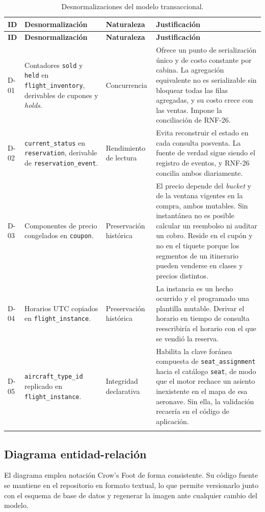 \documentclass[10pt,letterpaper]{article}
\begin{document}
\begin{longtable}{@{}L{1.2cm} L{4.8cm} L{3.0cm} L{6.8cm}@{}}
\toprule \textbf{ID} & \textbf{Desnormalización} & \textbf{Naturaleza} & \textbf{Justificación} \\ \midrule \endfirsthead
\toprule \textbf{ID} & \textbf{Desnormalización} & \textbf{Naturaleza} & \textbf{Justificación} \\ \midrule \endhead
D-01 & Contadores \texttt{sold} y \texttt{held} en \texttt{flight\_inventory}, derivables de cupones y \emph{holds}. & Concurrencia & Ofrece un punto de serialización único y de costo constante por cabina. La agregación equivalente no es serializable sin bloquear todas las filas agregadas, y su costo crece con las ventas. Impone la conciliación de RNF-26. \\
D-02 & \texttt{current\_status} en \texttt{reservation}, derivable de \texttt{reservation\_event}. & Rendimiento de lectura & Evita reconstruir el estado en cada consulta posventa. La fuente de verdad sigue siendo el registro de eventos, y RNF-26 concilia ambos diariamente. \\
D-03 & Componentes de precio congelados en \texttt{coupon}. & Preservación histórica & El precio depende del \emph{bucket} y de la ventana vigentes en la compra, ambos mutables. Sin instantánea no es posible calcular un reembolso ni auditar un cobro. Reside en el cupón y no en el tiquete porque los segmentos de un itinerario pueden venderse en clases y precios distintos. \\
D-04 & Horarios UTC copiados en \texttt{flight\_instance}. & Preservación histórica & La instancia es un hecho ocurrido y el programado una plantilla mutable. Derivar el horario en tiempo de consulta reescribiría el horario con el que se vendió la reserva. \\
D-05 & \texttt{aircraft\_type\_id} replicado en \texttt{flight\_instance}. & Integridad declarativa & Habilita la clave foránea compuesta de \texttt{seat\_assignment} hacia el catálogo \texttt{seat}, de modo que el motor rechace un asiento inexistente en el mapa de esa aeronave. Sin ella, la validación recaería en el código de aplicación. \\
\bottomrule
\caption{Desnormalizaciones del modelo transaccional.}
\end{longtable}

\subsection{Diagrama entidad-relación}
El diagrama emplea notación Crow's Foot de forma consistente. Su código fuente se mantiene en el repositorio en formato textual, lo que permite versionarlo junto con el esquema de base de datos y regenerar la imagen ante cualquier cambio del modelo.
\end{document}

